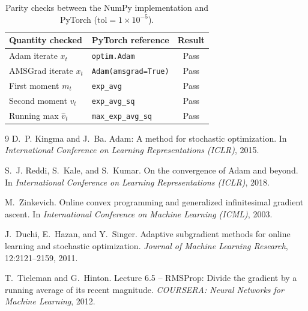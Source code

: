 \documentclass[10pt,twocolumn]{article}
\begin{document}
\begin{table}[h]
\centering
\small
\caption{Parity checks between the NumPy implementation and PyTorch ($\text{tol}=1\times10^{-5}$).}
\label{tab:parity}
\begin{tabular}{@{}p{3.0cm}p{3.2cm}c@{}}
\toprule
\textbf{Quantity checked} & \textbf{PyTorch reference} & \textbf{Result}\\
\midrule
Adam iterate $x_t$ & \texttt{optim.Adam} & Pass\\
AMSGrad iterate $x_t$ & \texttt{Adam(amsgrad=}\texttt{True)} & Pass\\
First moment $m_t$ & \texttt{exp\_avg} & Pass\\
Second moment $v_t$ & \texttt{exp\_avg\_sq} & Pass\\
Running max $\hat v_t$ & \texttt{max\_exp\_avg\_sq} & Pass\\
\bottomrule
\end{tabular}
\end{table}

\begin{thebibliography}{9}
D.~P. Kingma and J.~Ba.
\newblock Adam: A method for stochastic optimization.
\newblock In \emph{International Conference on Learning Representations (ICLR)}, 2015.

S.~J. Reddi, S.~Kale, and S.~Kumar.
\newblock On the convergence of Adam and beyond.
\newblock In \emph{International Conference on Learning Representations (ICLR)}, 2018.

M.~Zinkevich.
\newblock Online convex programming and generalized infinitesimal gradient ascent.
\newblock In \emph{International Conference on Machine Learning (ICML)}, 2003.

J.~Duchi, E.~Hazan, and Y.~Singer.
\newblock Adaptive subgradient methods for online learning and stochastic optimization.
\newblock \emph{Journal of Machine Learning Research}, 12:2121--2159, 2011.

T.~Tieleman and G.~Hinton.
\newblock Lecture 6.5 -- RMSProp: Divide the gradient by a running average of its recent magnitude.
\newblock \emph{COURSERA: Neural Networks for Machine Learning}, 2012.
\end{thebibliography}
\end{document}
